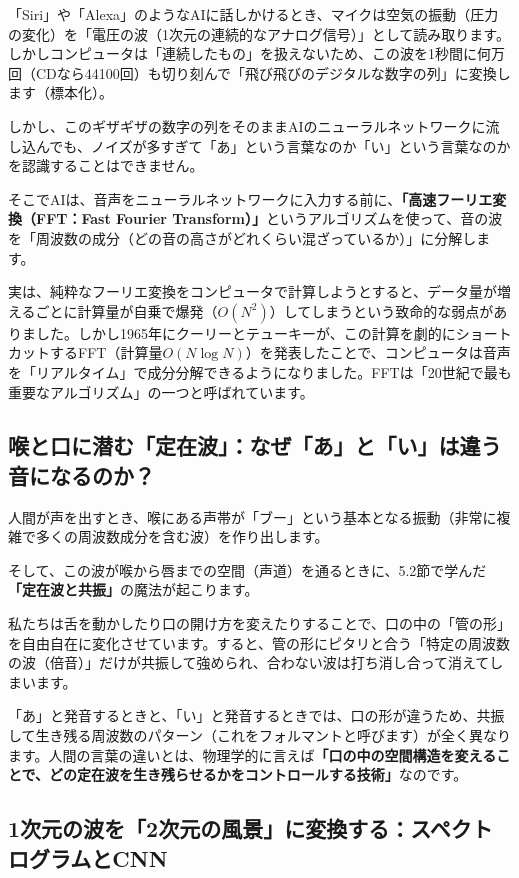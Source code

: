 「Siri」や「Alexa」のようなAIに話しかけるとき、マイクは空気の振動（圧力の変化）を「電圧の波（1次元の連続的なアナログ信号）」として読み取ります。しかしコンピュータは「連続したもの」を扱えないため、この波を1秒間に何万回（CDなら44100回）も切り刻んで「飛び飛びのデジタルな数字の列」に変換します（標本化）。

しかし、このギザギザの数字の列をそのままAIのニューラルネットワークに流し込んでも、ノイズが多すぎて「あ」という言葉なのか「い」という言葉なのかを認識することはできません。

そこでAIは、音声をニューラルネットワークに入力する前に、\textbf{「高速フーリエ変換（FFT：Fast Fourier Transform）」}というアルゴリズムを使って、音の波を「周波数の成分（どの音の高さがどれくらい混ざっているか）」に分解します。

実は、純粋なフーリエ変換をコンピュータで計算しようとすると、データ量が増えるごとに計算量が自乗で爆発（\(O(N^2)\)）してしまうという致命的な弱点がありました。しかし1965年にクーリーとテューキーが、この計算を劇的にショートカットするFFT（計算量\(O(N \log N)\)）を発表したことで、コンピュータは音声を「リアルタイム」で成分分解できるようになりました。FFTは「20世紀で最も重要なアルゴリズム」の一つと呼ばれています。

\subsection{喉と口に潜む「定在波」：なぜ「あ」と「い」は違う音になるのか？}

人間が声を出すとき、喉にある声帯が「ブー」という基本となる振動（非常に複雑で多くの周波数成分を含む波）を作り出します。

そして、この波が喉から唇までの空間（声道）を通るときに、5.2節で学んだ\textbf{「定在波と共振」}の魔法が起こります。

私たちは舌を動かしたり口の開け方を変えたりすることで、口の中の「管の形」を自由自在に変化させています。すると、管の形にピタリと合う「特定の周波数の波（倍音）」だけが共振して強められ、合わない波は打ち消し合って消えてしまいます。

「あ」と発音するときと、「い」と発音するときでは、口の形が違うため、共振して生き残る周波数のパターン（これをフォルマントと呼びます）が全く異なります。人間の言葉の違いとは、物理学的に言えば\textbf{「口の中の空間構造を変えることで、どの定在波を生き残らせるかをコントロールする技術」}なのです。

\subsection{1次元の波を「2次元の風景」に変換する：スペクトログラムとCNN}

